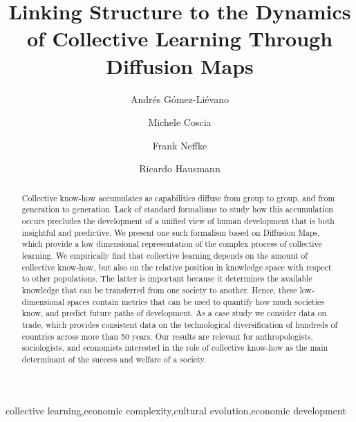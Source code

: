 \documentclass[hidelinks,preprint,12pt]{elsarticle}
\begin{document}
\begin{frontmatter}

\title{Linking Structure to the Dynamics of Collective Learning Through Diffusion Maps}

\author[hks]{Andr\'{e}s G\'{o}mez-Li\'{e}vano}
\author[hks]{Michele Coscia}
\author[hks]{Frank Neffke}
\author[hks]{Ricardo Hausmann}


\address[hks]{Center for International Development, Harvard University, Cambridge, USA}




\begin{abstract}
Collective know-how accumulates as capabilities diffuse from group to group, and from generation to generation. 
Lack of standard formalisms to study how this accumulation occurs precludes the development of a unified view of human development that is both insightful and predictive. 
We present one such formalism based on Diffusion Maps, which provide a low dimensional representation of the complex process of collective learning. 
We empirically find that collective learning depends on the amount of collective know-how, but also on the relative position in knowledge space with respect to other populations. 
The latter is important because it determines the available knowledge that can be transferred from one society to another. 
Hence, these low-dimensional spaces contain metrics that can be used to quantify how much societies know, and predict future paths of development. 
As a case study we consider data on trade, which provides consistent data on the technological diversification of hundreds of countries across more than 50 years. 
Our results are relevant for anthropologists, sociologists, and economists interested in the role of collective know-how as the main determinant of the success and welfare of a society.
\end{abstract}

\begin{keyword}
collective learning\sep economic complexity\sep cultural evolution\sep economic development
\end{keyword}

\end{frontmatter}
\end{document}
